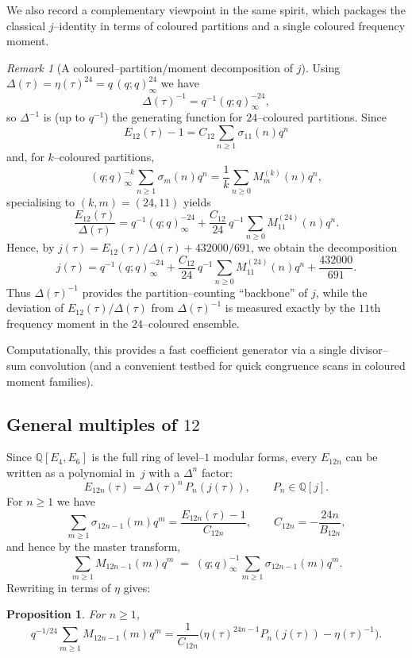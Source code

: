 \documentclass[11pt]{article}
\newtheorem{proposition}[theorem]{Proposition}
\theoremstyle{definition}
\theoremstyle{remark}
\newtheorem{remark}[theorem]{Remark}
\begin{document}
We also record a complementary viewpoint in the same spirit, which
packages the classical $j$--identity in terms of coloured partitions and a
single coloured frequency moment.

\begin{remark}[A coloured--partition/moment decomposition of $j$]\label{rem:j-coloured}
Using $\Delta(\tau)=\eta(\tau)^{24}=q\,(q;q)_\infty^{24}$ we have
\[
  \Delta(\tau)^{-1}=q^{-1}(q;q)_\infty^{-24},
\]
so $\Delta^{-1}$ is (up to $q^{-1}$) the generating function for
$24$--coloured partitions.  Since
\[
  E_{12}(\tau)-1=C_{12}\sum_{n\ge1}\sigma_{11}(n)q^n
\]
and, for $k$--coloured partitions,
\[
  (q;q)_\infty^{-k}\sum_{n\ge1}\sigma_m(n)q^n
  =\frac1{k}\sum_{n\ge0} M^{(k)}_{m}(n)q^n,
\]
specialising to $(k,m)=(24,11)$ yields
\[
  \frac{E_{12}(\tau)}{\Delta(\tau)}
  = q^{-1}(q;q)_\infty^{-24}
  + \frac{C_{12}}{24}\,q^{-1}\sum_{n\ge0} M^{(24)}_{11}(n)q^n.
\]
Hence, by $j(\tau)=E_{12}(\tau)/\Delta(\tau)+432000/691$, we obtain the
decomposition
\[
  j(\tau)
  = q^{-1}(q;q)_\infty^{-24}
  + \frac{C_{12}}{24}\,q^{-1}\sum_{n\ge0} M^{(24)}_{11}(n)q^n
  + \frac{432000}{691}.
\]
Thus $\Delta(\tau)^{-1}$ provides the partition--counting ``backbone'' of $j$,
while the deviation of $E_{12}(\tau)/\Delta(\tau)$ from $\Delta(\tau)^{-1}$ is
measured exactly by the $11$th frequency moment in the $24$--coloured ensemble.

Computationally, this provides a fast coefficient generator via a single
divisor--sum convolution (and a convenient testbed for quick congruence
scans in coloured moment families).
\end{remark}


\subsection{General multiples of $12$}

Since $\mathbb{Q}[E_4,E_6]$ is the full ring of level--$1$ modular
forms, every $E_{12n}$ can be written as a polynomial in~$j$ with a
$\Delta^n$ factor:
\[
  E_{12n}(\tau)=\Delta(\tau)^n\,P_n(j(\tau)),\qquad P_n\in\mathbb{Q}[j].
\]
For $n\ge1$ we have
\[
  \sum_{m\ge1}\sigma_{12n-1}(m)q^m=\frac{E_{12n}(\tau)-1}{C_{12n}},
  \qquad C_{12n}=-\frac{24n}{B_{12n}},
\]
and hence by the master transform,
\[
  \sum_{m\ge1}M_{12n-1}(m)q^m
  \;=\;
  (q;q)_\infty^{-1}\sum_{m\ge1}\sigma_{12n-1}(m)q^m.
\]
Rewriting in terms of $\eta$ gives:

\begin{proposition}\label{prop:12n}
For $n\ge1$,
\[
    q^{-1/24}\sum_{m\ge1} M_{12n-1}(m)q^m
  =
  \frac{1}{C_{12n}}
  \Big(\eta(\tau)^{24n-1}P_n(j(\tau))-\eta(\tau)^{-1}\Big).
\]
\end{proposition}
\end{document}
